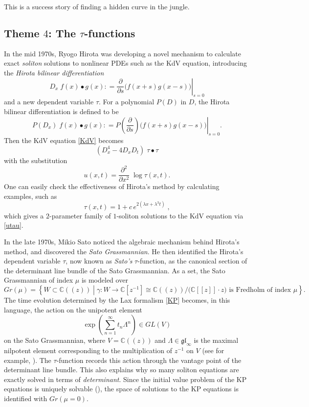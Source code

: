 \documentclass{amsart}
\theoremstyle{definition}
\numberwithin{equation}{section}
\numberwithin{figure}{section}
\def\isom{\cong}
\def\lam{\lambda}
\def\Lam{\Lambda}
\def\gam{\gamma}
\newcommand{\be}{\begin{equation}}
\newcommand{\ee}{\end{equation}}
\newcommand{\bC}{{\mathbb{C}}}
\newcommand{\lrar}{\longrightarrow}
\begin{document}
This is a success story of finding a hidden curve in the jungle. 


\subsection{Theme $4$: The $\tau$-functions}


In the mid 1970s, Ryogo Hirota was developing a novel mechanism to
calculate exact \emph{soliton} solutions to nonlinear PDEs
such as  the KdV equation, introducing
the \emph{Hirota bilinear differentiation}
$$
D_x \; f(x)\bullet g(x): = \left.\frac{\partial}{\partial s} \big(f(x+s)g(x-s)\big)
\right|_{s=0}
$$
and a new dependent variable $\tau$.
For a polynomial $P(D)$ in $D$, the Hirota bilinear differentiation is
defined to be
$$
P(D_x) \; f(x)\bullet g(x): = \left. P\left(\frac{\partial}{\partial s}\right) \big(f(x+s)g(x-s)\big)
\right|_{s=0}.
$$
Then the KdV equation \eqref{KdV}  becomes
$$
\left(D_x^4 - 4D_xD_t\right)\; \tau\bullet \tau 
$$
with the substitution 
\be
\label{utau}
u(x,t) = \frac{\partial^2}{\partial x^2} \; \log \tau(x,t).
\ee
One can easily check the effectiveness of Hirota's method by 
calculating examples, such as
$$
\tau(x,t) = 1+ c\, e^{2(\lam x + \lam^3 t)}\;,
$$
which gives a $2$-parameter family of $1$-soliton solutions to the KdV equation via \eqref{utau}.

In the late 1970s, Mikio Sato noticed the algebraic mechanism behind
Hirota's method, and discovered  the \emph{Sato Grassmannian}. He then 
identified the Hirota's dependent variable $\tau$, now known as
\emph{Sato's} $\tau$-function,  as the canonical section 
of the determinant line bundle of the Sato Grassmannian.
As a set, the Sato Grassmannian of index $\mu$ is modeled over
$$
Gr(\mu) = \left\{ W\subset \bC((z))\;\left|\; \gam: W\lrar \bC[z^{-1}]
\isom \bC((z))\big/\big(\bC[[z]]\cdot z\big) \text{ is Fredholm of index } \mu
\right\}\right. .
$$
The time evolution determined by the Lax formalism \eqref{KP}
becomes, in this language, the action on the unipotent element
$$
\exp\left(\sum_{n=1}^\infty t_n \Lam^n\right)
\in GL(V)
$$
on the Sato Grassmannian, where $V=\bC((z))$ and
$\Lam\in \mathfrak{gl}_\infty$ is the
maximal nilpotent element corresponding to  the
multiplication of $z^{-1}$ on $V$
(see for example, \cite[Chapter 7]{M1994}). 
The $\tau$-function records this action through the vantage point of 
the determinant line bundle. This also explains why so many
soliton equations are exactly solved in terms of \emph{determinant}.
Since the initial value problem of the KP equations is uniquely
solvable (\cite{M1984a, M1988}), the space of solutions to the 
KP equations is identified with $Gr(\mu=0)$. 
\end{document}

